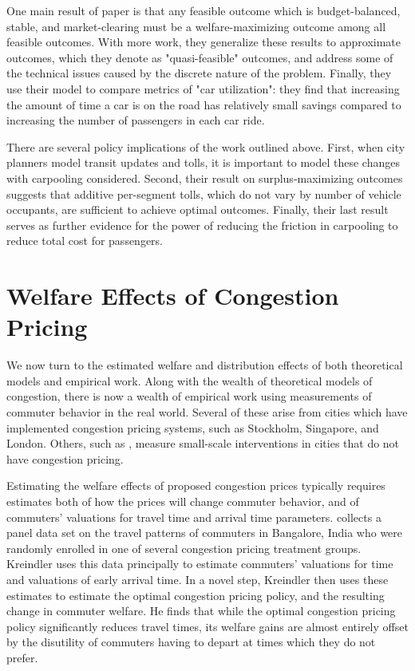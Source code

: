 \documentclass[JEL]{AEA}
\begin{document}
One main result of \cite{ostrovsky-2018} paper is that any feasible outcome which is budget-balanced, stable, and market-clearing must be a welfare-maximizing outcome among all feasible outcomes. With more work, they generalize these results to approximate outcomes, which they denote as "quasi-feasible" outcomes, and address some of the technical issues caused by the discrete nature of the problem. Finally, they use their model to compare metrics of "car utilization": they find that increasing the amount of time a car is on the road has relatively small savings compared to increasing the number of passengers in each car ride.

There are several policy implications of the work outlined above. First, when city planners model transit updates and tolls, it is important to model these changes with carpooling considered. Second, their result on surplus-maximizing outcomes suggests that additive per-segment tolls, which do not vary by number of vehicle occupants, are sufficient to achieve optimal outcomes. Finally, their last result serves as further evidence for the power of reducing the friction in carpooling to reduce total cost for passengers.

\section{Welfare Effects of Congestion Pricing}
\label{welfare-effects}

We now turn to the estimated welfare and distribution effects of both theoretical models and empirical work. Along with the wealth of theoretical models of congestion, there is now a wealth of empirical work using measurements of commuter behavior in the real world. Several of these arise from cities which have implemented congestion pricing systems, such as Stockholm, Singapore, and London. Others, such as \cite{kreindler-2018}, measure small-scale interventions in cities that do not have congestion pricing.

Estimating the welfare effects of proposed congestion prices typically requires estimates both of how the prices will change commuter behavior, and of commuters' valuations for travel time and arrival time parameters. \cite{kreindler-2018} collects a panel data set on the travel patterns of commuters in Bangalore, India who were randomly enrolled in one of several congestion pricing treatment groups. Kreindler uses this data principally to estimate commuters' valuations for time and valuations of early arrival time. In a novel step, Kreindler then uses these estimates to estimate the optimal congestion pricing policy, and the resulting change in commuter welfare. He finds that while the optimal congestion pricing policy significantly reduces travel times, its welfare gains are almost entirely offset by the disutility of commuters having to depart at times which they do not prefer.
\end{document}
